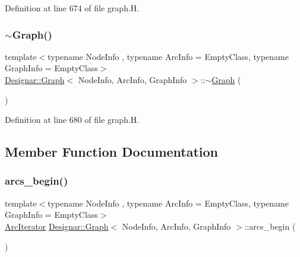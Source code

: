 Definition at line 674 of file graph.\+H.

\mbox{\label{class_designar_1_1_graph_a2ea20f9cb46279210e1eadaebcfe27f0}} 
\subsubsection{\texorpdfstring{$\sim$\+Graph()}{~Graph()}}
{\footnotesize\ttfamily template$<$typename Node\+Info , typename Arc\+Info  = Empty\+Class, typename Graph\+Info  = Empty\+Class$>$ \\
\hyperlink{class_designar_1_1_graph}{Designar\+::\+Graph}$<$ Node\+Info, Arc\+Info, Graph\+Info $>$\+::$\sim$\hyperlink{class_designar_1_1_graph}{Graph} (\begin{DoxyParamCaption}{ }\end{DoxyParamCaption})\hspace{0.3cm}{\ttfamily [inline]}}



Definition at line 680 of file graph.\+H.



\subsection{Member Function Documentation}
\mbox{\label{class_designar_1_1_graph_a9448ba557a7b0ef90651d74d4a4ee36b}} 
\subsubsection{\texorpdfstring{arcs\+\_\+begin()}{arcs\_begin()}\hspace{0.1cm}{\footnotesize\ttfamily [1/4]}}
{\footnotesize\ttfamily template$<$typename Node\+Info , typename Arc\+Info  = Empty\+Class, typename Graph\+Info  = Empty\+Class$>$ \\
\hyperlink{class_designar_1_1_graph_1_1_arc_iterator}{Arc\+Iterator} \hyperlink{class_designar_1_1_graph}{Designar\+::\+Graph}$<$ Node\+Info, Arc\+Info, Graph\+Info $>$\+::arcs\+\_\+begin (\begin{DoxyParamCaption}{ }\end{DoxyParamCaption})\hspace{0.3cm}{\ttfamily [inline]}}



